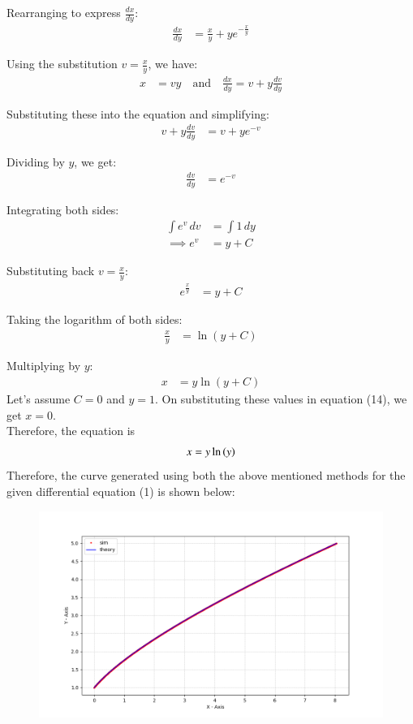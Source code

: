 \documentclass[journal]{IEEEtran}
\begin{document}
\begin{enumerate}
Rearranging to express \( \frac{dx}{dy} \):
\begin{align}
    \frac{dx}{dy} &= \frac{x}{y} + y e^{-\frac{x}{y}}
\end{align}

Using the substitution \( v = \frac{x}{y} \), we have:
\begin{align}
    x &= vy \quad \text{and} \quad \frac{dx}{dy} = v + y \frac{dv}{dy}
\end{align}

Substituting these into the equation and simplifying:
\begin{align}
    v + y \frac{dv}{dy} &= v + y e^{-v}
\end{align}

Dividing by \( y \), we get:
\begin{align}
    \frac{dv}{dy} &= e^{-v}
\end{align}

Integrating both sides:
\begin{align}
    \int e^v \, dv &= \int 1 \, dy \\
    \implies e^v &= y + C
\end{align}

Substituting back \( v = \frac{x}{y} \):
\begin{align}
    e^{\frac{x}{y}} &= y + C
\end{align}

Taking the logarithm of both sides:
\begin{align}
    \frac{x}{y} &= \ln(y + C)
\end{align}

Multiplying by \( y \):
\begin{align}
    x &= y \ln(y + C)
\end{align}
Let's assume $C = 0$ and $y=1$. On substituting these values in equation (14), we get $x = 0$.\\
Therefore, the equation is
\begin{align*}
    x = y \ln{\ensuremath{\left(y\right)}}
\end{align*}
Therefore, the curve generated using both the above mentioned methods for the given differential equation (1) is shown below:
\begin{figure}[H]
    \centering
    \includegraphics[width = \columnwidth]{figs/fig.png}
\end{figure}
\end{enumerate}
\end{document}
